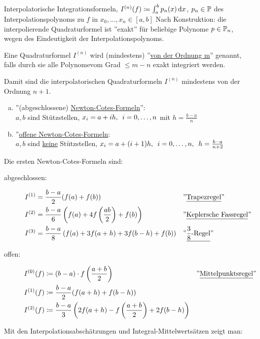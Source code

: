 \documentclass[11pt,a4paper,oneside]{scrartcl}
\begin{document}
Interpolatorische Integrationsformeln, \(I^{(n)}
(f)\coloneqq\int^b_ap_n(x)\mathop{}\!\mathrm{d} 
x\), \( p_n\in\mathbb{P}\) des Interpolationspolynoms zu \(f\) in  
\(x_0,\dots,x_n
\in[a,b]\) Nach Konstruktion: die interpolierende Quadraturformel ist 
''exakt'' 
für beliebige Polynome \(p\in\mathbb{P}_n\), wegen des Eindeutigkeit der 
Interpolationspolynoms.
\begin{definition}
    Eine Quadraturformel \(I^{(n)}\) wird (mindestens) ''\underline{von 
    der 
    Ordnung m}'' genannt, falls durch sie alle Polynomevom Grad \(\leq 
    m-n\) 
    exakt integriert werden.
\end{definition}
Damit sind die interpolatorischen Quadraturformeln \(I^{(n)}\) 
mindestens von der 
Ordnung \(n+1\).

\begin{example}\hfill
\begin{enumerate}[(a)]
    \item ''(abgeschlossene) \underline{Newton-Cotes-Formeln}'':\\
    $a,b$ sind Stützstellen, $x_i=a+ih,\hspace{.5em} i = 0,\dots, n$ mit 
    $h=\frac{b-a}{n}$
    \item ''\underline{offene Newton-Cotes-Formeln}:\\
    $a,b$ sind \underline{keine} Stützstellen, $x_i = a+(i+1)h,\hspace{.5em}
    i = 0,\dots, n, \hspace{.5em} h=\frac{b-a}{n+2}$
\end{enumerate}
Die ersten Newton-Cotes-Formeln sind:
\begin{description}
\item[abgeschlossen:]\begin{align*}
    I^{(1)} &= \frac{b-a}{2}(f(a) + f(b)) && 
    \text{''\underline{Trapezregel}''}\\
    I^{(2)} &= \frac{b-a}{6}\left(f(a) + 4f\left(\frac{ab}{2}\right) + 
    f(b)\right) && \text{''\underline{Keplersche Fassregel}''}\\
    I^{(3)} &= \frac{b-a}{8}\left(f(a) + 3f(a+h) + 3f(b-h) + f(b)\right)
    && 
    \text{''\underline{$\frac{3}{8}$-Regel}''}
\end{align*}    
\item[offen:]\begin{align*}
    I^{(0)}(f) &\coloneqq (b-a) \cdot f\left(\frac{a+b}{2}\right) && 
    \text{''\underline{Mittelpunktsregel}''}\\
    I^{(1)}(f) &\coloneqq \frac{b-a}{2}(f(a+h) + f(b-h))\\
    I^{(2)}(f) &\coloneqq \frac{b-a}{3}\left(2f(a+h) - f\left(\frac{a+b}
    {2}\right) + 2f(b-h)\right)  
\end{align*}

\end{description}
\end{example}
Mit den Interpolationsabschätzungen und Integral-Mittelwertsätzen zeigt 
man:
\end{document}

